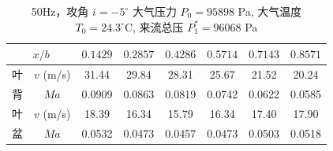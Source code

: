 \begin{table}[H]
  \centering
  \caption[50Hz 攻角 $i=-5^\circ$ v/Ma 数据]{50Hz，攻角 $i=-5^\circ$ 大气压力 $P_0=95898$ Pa, 大气温度 $T_0=24.3^\circ\text{C}$, 来流总压 $P_1^*=96068$ Pa}
  \label{tab:exp4_vma_50Hz_-5}
  \renewcommand{\arraystretch}{1.2}
  \begin{tabular}{cccccccc}
    \toprule
    \multicolumn{2}{c}{$x/b$} & $0.1429$ & $0.2857$ & $0.4286$ & $0.5714$ & $0.7143$ & $0.8571$ \\
    \midrule
    叶 & $v$ (m/s) & 31.44 & 29.84 & 28.31 & 25.67 & 21.52 & 20.24 \\
    背 & $Ma$ & 0.0909 & 0.0863 & 0.0819 & 0.0742 & 0.0622 & 0.0585 \\
    \midrule
    叶 & $v$ (m/s) & 18.39 & 16.34 & 15.79 & 16.34 & 17.40 & 17.90 \\
    盆 & $Ma$ & 0.0532 & 0.0473 & 0.0457 & 0.0473 & 0.0503 & 0.0518 \\
    \bottomrule
  \end{tabular}
\end{table}